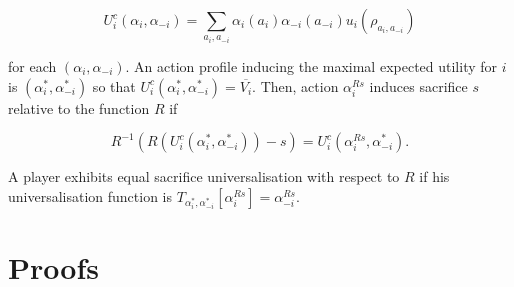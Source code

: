 \[  U^{c}_i \left( \alpha_i, \alpha_{-i} \right) = \sum_{a_i, a_{-i}} \alpha_{i} (a_i) \alpha_{-i}(a_{-i}) u_i(\rho_{a_i, a_{-i}})
\]

for each \( \left( \alpha_i, \alpha_{-i} \right) \). An action profile inducing the maximal expected utility for \( i \) is \( \left( \alpha^{*}_i, \alpha^{*}_{-i} \right) \) so that \( U^{c}_i \left( \alpha^{*}_i, \alpha^{*}_{-i} \right) = \overline{V_i} \). Then, action \( \alpha_i^{Rs} \) induces sacrifice \( s \) relative to the function \( R \) if

\[
	R^{-1} \left( R \left( U^{c}_i \left( \alpha^{*}_i, \alpha^{*}_{-i} \right) \right) - s \right) = U^{c}_i \left( \alpha^{Rs}_i, \alpha^{*}_{-i} \right) .
\]

A player exhibits equal sacrifice universalisation with respect to \( R \) if his universalisation function is \( T_{\alpha^{*}_i, \alpha^{*}_{-i}} \left[ \alpha^{Rs}_i \right] = \alpha_{-i}^{Rs} \).

\section{Proofs}\label{sec:proofs}\label{app:proofsuniv}


